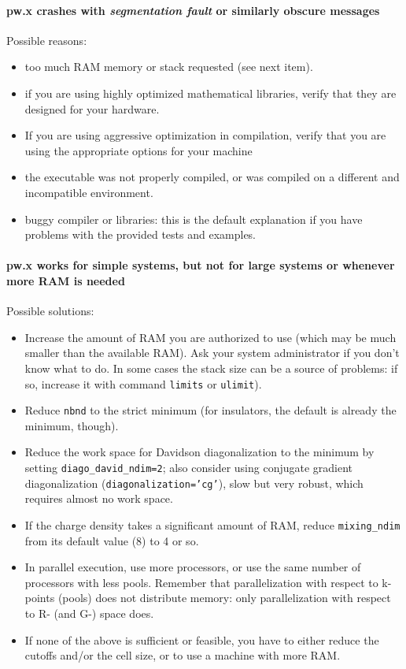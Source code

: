 \documentclass[12pt,a4paper]{article}
\begin{document}
\paragraph{pw.x crashes with {\em segmentation fault} or similarly
  obscure messages} 
Possible reasons:
\begin{itemize}
\item  too much RAM memory or stack  requested (see next item). 
\item if you are using highly optimized mathematical libraries, verify
  that they are designed for your hardware.
\item If you are using aggressive optimization in compilation, verify
that you are using the appropriate options for your machine
\item the executable was not properly compiled, or was compiled on
a different and incompatible environment.
\item buggy compiler or libraries: this is the default explanation if you
have problems with the provided tests and examples.
\end{itemize}

\paragraph{pw.x works for simple systems, but not for large systems
  or whenever more RAM is needed}  
Possible solutions:
\begin{itemize}
\item Increase the amount of RAM you are authorized to use (which may
  be much smaller than the available RAM). Ask your system
  administrator if you don't know what to do. In some cases the 
  stack size can be a source of problems: if so, increase it with command 
  \texttt{limits} or \texttt{ulimit}).
\item Reduce \texttt{nbnd} to the strict minimum (for insulators, the
default is already the minimum, though).
\item Reduce the work space for Davidson diagonalization to the minimum
 by setting \texttt{diago\_david\_ndim=2}; also consider using conjugate
 gradient diagonalization (\texttt{diagonalization='cg'}), slow but very 
 robust, which requires almost no work space.
\item If the charge density takes a significant amount of RAM, reduce 
 \texttt{mixing\_ndim} from its default value (8) to 4 or so.
\item In parallel execution, use more processors, or use the same
  number of processors with less pools. Remember that parallelization
  with respect to k-points (pools) does not distribute memory:
  only parallelization with respect to R- (and G-) space does. 
\item If none of the above is sufficient or feasible, you have to either
  reduce the cutoffs and/or the cell size, or to use a machine with 
  more RAM.
\end{itemize}
\end{document}
